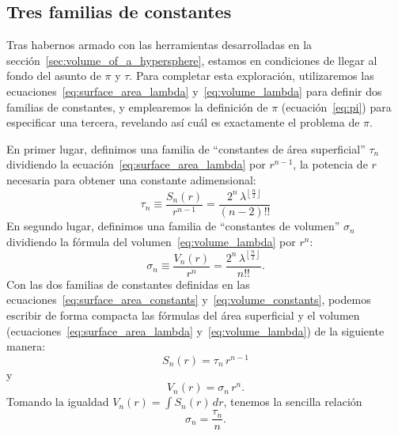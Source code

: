 


  \subsection{Tres familias de constantes} %
  \label{sec:three_families_of_constants}

Tras habernos armado con las herramientas desarrolladas en la sección~\ref{sec:volume_of_a_hypersphere}, estamos en condiciones de llegar al fondo del asunto de $\pi$ y $\tau$. Para completar esta exploración, utilizaremos las ecuaciones~\eqref{eq:surface_area_lambda} y~\eqref{eq:volume_lambda} para definir dos familias de constantes, y emplearemos la definición de $\pi$ (ecuación~\eqref{eq:pi}) para especificar una tercera, revelando así cuál es exactamente el problema de $\pi$.

En primer lugar, definimos una familia de ``constantes de área superficial'' $\tau_n$ dividiendo \linebreak la ecuación~\eqref{eq:surface_area_lambda} por $r^{n-1}$, la potencia de $r$ necesaria para obtener una constante adimensional:
\begin{equation}
\label{eq:surface_area_constants}
\tau_n \equiv \frac{S_n(r)}{r^{n-1}} = \frac{2^n\,\lambda^{\left\lfloor \frac{n}{2} \right\rfloor}}{(n-2)!!}
\end{equation}
En segundo lugar, definimos una familia de ``constantes de volumen'' $\sigma_n$ dividiendo la fórmula del volumen~\eqref{eq:volume_lambda} por $r^n$:
\begin{equation}
\label{eq:volume_constants}
\sigma_n \equiv \frac{V_n(r)}{r^n} = \frac{2^n\,\lambda^{\left\lfloor \frac{n}{2} \right\rfloor}}{n!!}.
\end{equation}
Con las dos familias de constantes definidas en las ecuaciones~\eqref{eq:surface_area_constants} y~\eqref{eq:volume_constants}, podemos escribir de forma compacta las fórmulas del área superficial y el volumen (ecuaciones~\eqref{eq:surface_area_lambda} y~\eqref{eq:volume_lambda}) de la siguiente manera:
\[ S_n(r) = \tau_n\,r^{n-1} \]
y
\[ V_n(r) = \sigma_n\,r^n. \]
Tomando la igualdad $V_n(r) = \int S_n(r)\,dr$, tenemos la sencilla relación
\[
\sigma_n = \frac{\tau_n}{n}.
\]

